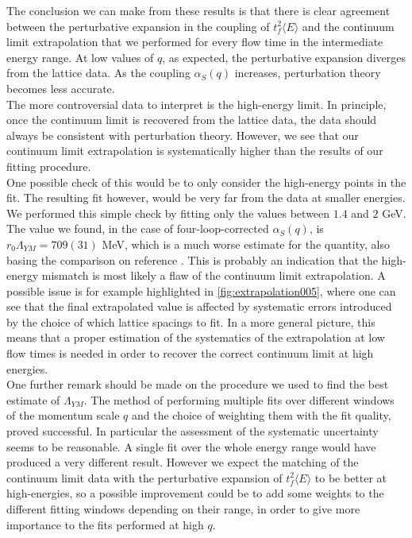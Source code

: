 The conclusion we can make from these results is that there is clear agreement between the perturbative expansion in the coupling of $t_f^2\langle E\rangle$ and the continuum limit extrapolation that we performed for every flow time in the intermediate energy range. At low values of $q$, as expected,  the perturbative expansion diverges from the lattice data. As the coupling $\alpha_S(q)$ increases, perturbation theory becomes less accurate.\\
The more controversial data to interpret is the high-energy limit. In principle, once the continuum limit is recovered from the lattice data, the data should always be consistent with perturbation theory. However, we see that our continuum limit extrapolation is systematically higher than the results of our fitting procedure.  \\
One possible check of this would be to only consider the high-energy points in the fit. The resulting fit however, would be very far from the data at smaller energies. We performed this simple check by fitting only the values between $1.4$ and $2$ GeV. The value we found, in the case of four-loop-corrected $\alpha_S(q)$, is $r_0\Lambda_{YM} = 709(31)$ MeV, which is a much worse estimate for the quantity, also basing the comparison on reference \cite{capitani_non-perturbative_1999}. This is probably an indication that the high-energy mismatch is most likely a flaw of the continuum limit extrapolation. A possible issue is for example highlighted in \cref{fig:extrapolation005}, where one can see that the final extrapolated value is affected by systematic errors introduced by the choice of which lattice spacings to fit. In a more general picture, this means that a proper estimation of the systematics of the extrapolation at low flow times is needed in order to recover the correct continuum limit at high energies.\\
One further remark should be made on the procedure we used to find the best estimate of $\Lambda_{YM}$. The method of performing multiple fits over different windows of the momentum scale $q$ and the choice of weighting them with the fit quality, proved successful. In particular the assessment of the systematic uncertainty seems to be reasonable. A single fit over the whole energy range would have produced a very different result. However we expect the matching of the continuum limit data with the perturbative expansion of  $t_f^2\langle E\rangle$  to be better at high-energies, so a possible improvement could be to add some weights to the different fitting windows depending on their range, in order to give more importance to the fits performed at high $q$. 
